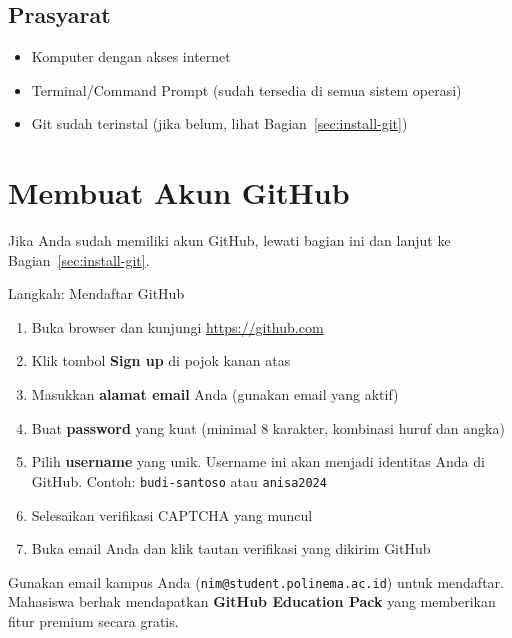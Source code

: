 \documentclass[
    a4paper,
    11pt,
    parskip=half
]{scrartcl}
\begin{document}
\subsection{Prasyarat}

\begin{itemize}
    \item Komputer dengan akses internet
    \item Terminal/Command Prompt (sudah tersedia di semua sistem operasi)
    \item Git sudah terinstal (jika belum, lihat Bagian~\ref{sec:install-git})
\end{itemize}

\section{Membuat Akun GitHub}
\label{sec:github-account}

Jika Anda sudah memiliki akun GitHub, lewati bagian ini dan lanjut ke Bagian~\ref{sec:install-git}.

\begin{stepbox}{Langkah: Mendaftar GitHub}
\begin{enumerate}
    \item Buka browser dan kunjungi \url{https://github.com}
    \item Klik tombol \textbf{Sign up} di pojok kanan atas
    \item Masukkan \textbf{alamat email} Anda (gunakan email yang aktif)
    \item Buat \textbf{password} yang kuat (minimal 8 karakter, kombinasi huruf dan angka)
    \item Pilih \textbf{username} yang unik. Username ini akan menjadi identitas Anda di GitHub.
          Contoh: \texttt{budi-santoso} atau \texttt{anisa2024}
    \item Selesaikan verifikasi CAPTCHA yang muncul
    \item Buka email Anda dan klik tautan verifikasi yang dikirim GitHub
\end{enumerate}
\end{stepbox}

\begin{tipbox}
Gunakan email kampus Anda (\texttt{nim@student.polinema.ac.id}) untuk mendaftar. Mahasiswa berhak mendapatkan \textbf{GitHub Education Pack} yang memberikan fitur premium secara gratis.
\end{tipbox}
\end{document}
